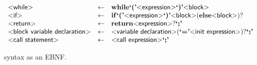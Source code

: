 \begin{figure}
\[\begin{array}{lcl}
  \text{\sf\textless while\textgreater} & \gets & \mathbf{while} \text{\bf`('} \text{\sf\textless expression\textgreater} \text{\bf`)'} \text{\sf\textless block\textgreater}\\

  \text{\sf\textless if\textgreater} & \gets & \mathbf{if} \text{\bf`('} \text{\sf\textless expression\textgreater} \text{\bf`)'} \text{\sf\textless block\textgreater}
  (\mathbf{else} \text{\sf\textless block\textgreater})?\\

  \text{\sf\textless return\textgreater} & \gets & \mathbf{return} \text{\sf\textless expression\textgreater}? \text{\bf`;'}\\

  \text{\sf\textless block variable declaration\textgreater} & \gets &
  \text{\sf\textless variable declaration\textgreater} (\text{\bf`='} \text{\sf\textless init expression\textgreater})? \text{\bf`;'}\\

  \text{\sf\textless call statement\textgreater} & \gets & \text{\sf\textless call expression\textgreater} \text{\bf`;'}\\

\end{array}
\]
  \caption {\pencil{} syntax as an EBNF.}
  \label{fig:pencil-syntax}
\end{figure}


